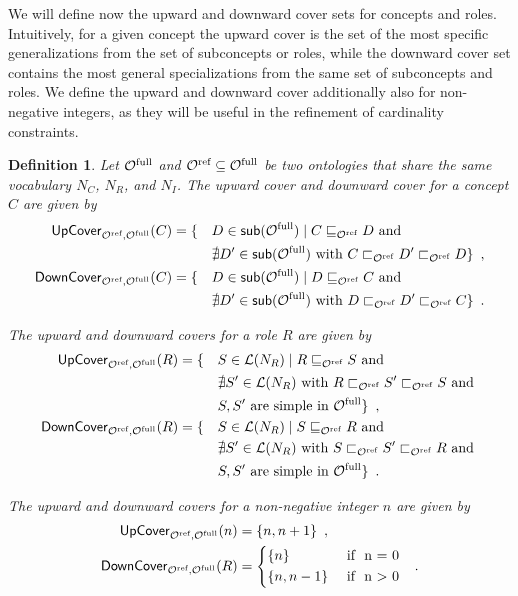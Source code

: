 \documentclass[
]{ceurart}
\newtheorem{definition}{Definition}
\begin{document}
We will define now the upward and downward cover sets for concepts and roles. Intuitively, for a given concept the upward cover is the set of the most specific generalizations from the set of subconcepts or roles, while the downward cover set contains the most general specializations from the same set of subconcepts and roles. We define the upward and downward cover additionally also for non-negative integers, as they will be useful in the refinement of cardinality constraints.

\begin{definition} \label{def:covers}
  Let ${\mathcal{O}^\textnormal{full}}$ and ${\mathcal{O}^\textnormal{ref}} \subseteq {\mathcal{O}^\textnormal{full}}$ be two \SROIQ ontologies that share the same vocabulary $N_C$, $N_R$, and $N_I$. The \emph{upward cover} and \emph{downward cover} for a concept $C$ are given by
  \begin{alignat*}{2}
    {\ensuremath{\mathsf{UpCover}}}_{{\mathcal{O}^\textnormal{ref}},{\mathcal{O}^\textnormal{full}}}(C) &= \{ &&D \in \mathop{\mathsf{sub}}({\mathcal{O}^\textnormal{full}}) \mid C \sqsubseteq_{\mathcal{O}^\textnormal{ref}} D \text{ and } \\
    &&&\nexists D' \in \mathop{\mathsf{sub}}({\mathcal{O}^\textnormal{full}}) \text{ with } C \sqsubset_{\mathcal{O}^\textnormal{ref}} D' \sqsubset_{\mathcal{O}^\textnormal{ref}} D \} \enspace, \\
    {\mathsf{DownCover}}_{{\mathcal{O}^\textnormal{ref}},{\mathcal{O}^\textnormal{full}}}(C) &= \{ &&D \in \mathop{\mathsf{sub}}({\mathcal{O}^\textnormal{full}}) \mid D \sqsubseteq_{\mathcal{O}^\textnormal{ref}} C \text{ and } \\
    &&&\nexists D' \in \mathop{\mathsf{sub}}({\mathcal{O}^\textnormal{full}}) \text{ with } D \sqsubset_{\mathcal{O}^\textnormal{ref}} D' \sqsubset_{\mathcal{O}^\textnormal{ref}} C \} \enspace.
  \end{alignat*}

  The upward and downward covers for a role $R$ are given by
  \begin{alignat*}{2}
    {\ensuremath{\mathsf{UpCover}}}_{{\mathcal{O}^\textnormal{ref}},{\mathcal{O}^\textnormal{full}}}(R) &= \{ &&S \in \mathcal{L}(N_R) \mid R \sqsubseteq_{\mathcal{O}^\textnormal{ref}} S \text{ and } \\
    &&& \nexists S' \in \mathcal{L}(N_R) \text{ with } R \sqsubset_{\mathcal{O}^\textnormal{ref}} S' \sqsubset_{\mathcal{O}^\textnormal{ref}} S \text{ and } \\
    &&& S, S' \text{ are simple in } {\mathcal{O}^\textnormal{full}} \} \enspace, \\
    {\mathsf{DownCover}}_{{\mathcal{O}^\textnormal{ref}},{\mathcal{O}^\textnormal{full}}}(R) &= \{ &&S \in \mathcal{L}(N_R) \mid S \sqsubseteq_{\mathcal{O}^\textnormal{ref}} R \text{ and } \\
    &&&\nexists S' \in \mathcal{L}(N_R) \text{ with } S \sqsubset_{\mathcal{O}^\textnormal{ref}} S' \sqsubset_{\mathcal{O}^\textnormal{ref}} R \text{ and } \\
    &&& S, S' \text{ are simple in } {\mathcal{O}^\textnormal{full}} \} \enspace.
  \end{alignat*}

  The upward and downward covers for a non-negative integer $n$ are given by
  \begin{alignat*}{2}
    \UpC_{\Omcref,\Omcfull}(n) &= \{ n, n + 1 \} \enspace, \\
    \DownC_{\Omcref,\Omcfull}(R) &=
    \begin{cases*}
      \{ n \} & \text{ if } n = 0 \\
      \{ n, n - 1 \} & \text{ if } n > 0
    \end{cases*} \enspace.
  \end{alignat*}
\end{definition}
\end{document}

